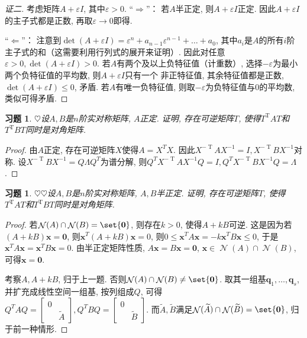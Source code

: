 \documentclass{ctexart}
\newtheorem{exercise}[thm]{习题}
\newcommand\bs[1]{\boldsymbol{ #1}}
\def\hard{$\heartsuit$}
\def\wtd{\widetilde}
\DeclareMathOperator{\T}{T}
\DeclareMathOperator{\nullspace}{\mathcal{N}}
\begin{document}
\begin{proof}[证二]
	考虑矩阵$A+\varepsilon I$, 其中$\varepsilon>0$. 
	``$\Rightarrow$''：
	若$A$半正定, 则$A+\varepsilon I$正定. 因此$A+\varepsilon I$的主子式都是正数, 再取$\varepsilon \to 0$即得. 

	``$\Leftarrow$''：
	注意到$\det (A+\varepsilon I)=\varepsilon^n+a_{n-1}\varepsilon^{n-1}+\dots+a_0$, 其中$a_i$是$A$的所有$i$阶主子式的和（这需要利用行列式的展开来证明）. 
	因此对任意$\varepsilon>0,\det(A+\varepsilon I)>0$. 
	若$A$有两个及以上负特征值（计重数）, 选择$-\varepsilon$为最小两个负特征值的平均数, 则$A+\varepsilon I$只有一个%
非正特征值, 其余特征值都是正数, $\det(A+\varepsilon I)\leq0$, 矛盾. 
	若$A$有唯一负特征值, 则取$-\varepsilon$为负特征值与$0$的平均数, 类似可得矛盾. 
\end{proof}

\begin{exercise}\label{excs:6.2.18}
\hard 设$A, B$是$n$阶实对称矩阵, $A$正定. 
证明, 存在可逆矩阵$T$, 使得$T^{\T}AT$和$T^{\T}BT$同时是对角矩阵. 
\end{exercise}
\begin{proof}
	由$A$正定, 存在可逆矩阵$X$使得$A=X^TX$. 因此$X^{-\T}AX^{-1}=I,X^{-\T}BX^{-1}$对称. 设$X^{-\T}BX^{-1}=Q\Lambda Q^T$为谱分解, 则$Q^TX^{-\T}AX^{-1}Q=I,Q^TX^{-\T}BX^{-1}Q=\Lambda$. 
\end{proof}

\begin{exercise}
\hard\hard  设$A, B$是$n$阶实对称矩阵, $A,B$半正定. 
证明, 存在可逆矩阵$T$, 使得$T^{\T}AT$和$T^{\T}BT$同时是对角矩阵. 

\end{exercise}
\begin{proof}
	若$\nullspace(A)\cap\nullspace(B)=\set{\bs 0}$, 则存在$k>0$, 使得$A+kB$可逆. 
	这是因为若$(A+kB)\bs x=\bs 0$, 则$\bs x^T(A+kB)\bs x=0$, 则$0\le \bs x^TA\bs x=-k \bs x^TB\bs x\le 0$, 于是$\bs x^TA\bs x=\bs x^TB\bs x=0$. 
	由半正定矩阵性质, $A\bs x=B\bs x=\bs 0$, $\bs x\in \nullspace(A)\cap\nullspace(B)$, 可得$\bs x=\bs 0$. 

	考察$A,A+kB$, 归于上一题. 
	否则$\nullspace(A)\cap\nullspace(B)\ne\set{\bs 0}$. 
	取其一组基$\bs q_1,\dots,\bs q_s$, 并扩充成线性空间一组基, 按列组成$Q$, 可得$Q^TAQ=\begin{bmatrix}
		0 &\\ & \wtd A
	\end{bmatrix},Q^TBQ=\begin{bmatrix}
	0 & \\ & \wtd B
	\end{bmatrix}$. 而$\wtd A,\wtd B$满足$\nullspace(\wtd A)\cap\nullspace(\wtd B)=\set{\bs 0}$, 归于前一种情形. 
\end{proof}
\end{document}

